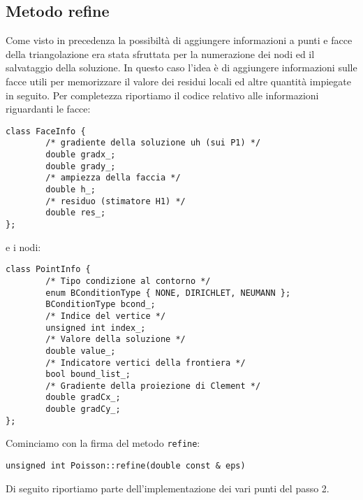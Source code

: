 \documentclass[a4paper,10pt,twoside]{amsart}
\theoremstyle{remark}
\theoremstyle{definition}
\renewcommand{\tt}{\texttt}
\begin{document}
\subsection{Metodo refine}
Come visto in precedenza la possibiltà di aggiungere informazioni a punti e facce della triangolazione era stata sfruttata per la numerazione dei nodi ed il salvataggio della soluzione. In questo caso l'idea è di aggiungere informazioni sulle facce utili per memorizzare il valore dei residui locali ed altre quantità impiegate in seguito. Per completezza riportiamo il codice relativo alle informazioni riguardanti le facce:
\begin{lstlisting}
class FaceInfo {
		/* gradiente della soluzione uh (sui P1) */
		double gradx_;
		double grady_;
		/* ampiezza della faccia */
		double h_;
		/* residuo (stimatore H1) */
		double res_;
};
\end{lstlisting}
e i nodi:
\begin{lstlisting}
class PointInfo {
		/* Tipo condizione al contorno */
		enum BConditionType { NONE, DIRICHLET, NEUMANN };
		BConditionType bcond_;
		/* Indice del vertice */
		unsigned int index_;
		/* Valore della soluzione */
		double value_;
		/* Indicatore vertici della frontiera */
		bool bound_list_;		
		/* Gradiente della proiezione di Clement */
		double gradCx_;
		double gradCy_;
};
\end{lstlisting}
Cominciamo con la firma del metodo \tt{refine}:
\begin{lstlisting}
unsigned int Poisson::refine(double const & eps)
\end{lstlisting}
Di seguito riportiamo parte dell'implementazione dei vari punti del passo 2. 
\end{document}
